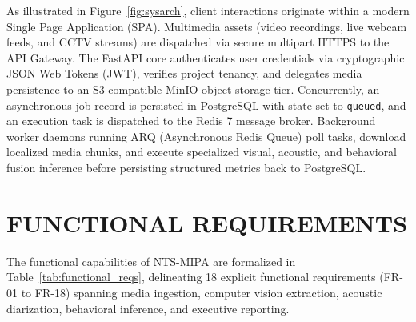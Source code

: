 \documentclass[12pt,a4paper,oneside]{report}
\begin{document}
As illustrated in Figure~\ref{fig:sysarch}, client interactions originate within a modern Single Page Application (SPA). Multimedia assets (video recordings, live webcam feeds, and CCTV streams) are dispatched via secure multipart HTTPS to the API Gateway. The FastAPI core authenticates user credentials via cryptographic JSON Web Tokens (JWT), verifies project tenancy, and delegates media persistence to an S3-compatible MinIO object storage tier. Concurrently, an asynchronous job record is persisted in PostgreSQL with state set to \texttt{queued}, and an execution task is dispatched to the Redis 7 message broker. Background worker daemons running ARQ (Asynchronous Redis Queue) poll tasks, download localized media chunks, and execute specialized visual, acoustic, and behavioral fusion inference before persisting structured metrics back to PostgreSQL.

\section{FUNCTIONAL REQUIREMENTS}
The functional capabilities of NTS-MIPA are formalized in Table~\ref{tab:functional_reqs}, delineating 18 explicit functional requirements (FR-01 to FR-18) spanning media ingestion, computer vision extraction, acoustic diarization, behavioral inference, and executive reporting.
\end{document}
